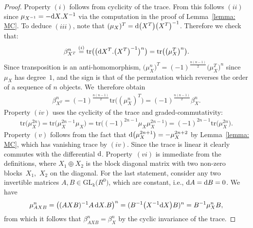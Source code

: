 \documentclass[pdftex]{sigma}%
\numberwithin{equation}{section}
\newcommand{\tr}{\mathrm{tr}}
\newcommand{\GL}{\mathrm{GL}}
\newcommand{\mc}{\mu}
\newcommand{\0}{\color{blue}{\mathsf{0}}}
\begin{document}
\begin{proof}
Property $(i)$ follows from cyclicity of the trace. From this follows $(ii)$ since $\mc_{X^{-1}} = - {\rm d}X. X^{-1}$ via the computation in the proof of Lemma~\ref{lemma: MC}. To deduce $(iii)$, note that $(\mc_X)^T = {\rm d} \big(X^T\big) \big(X^T\big)^{-1}$. Therefore we check that:
\begin{gather*}
\beta^n_{X^T} \overset{(i)}{=} \tr \big(\big({\rm d}X^T. \big(X^T\big)^{-1}\big)^n \big) =\tr \big(\big(\mc_X^T\big)^n\big) .
\end{gather*}
Since transposition is an anti-homomorphism, $\big(\mc_X^n\big)^T = (-1)^{\frac{n(n-1)}{2}} \big(\mc_X^T\big)^n$ since $\mu_X$ has degree~$1$, and the sign is that of the permutation which reverses the order of a sequence of $n$ objects. We~therefore obtain
\begin{gather*}
 \beta^n_{X^T} = (-1)^{\frac{n(n-1)}{2}} \tr \big((\mc^n_X)^T\big) =(-1)^{\frac{n(n-1)}{2}} \beta_X^n .
 \end{gather*}
Property $(iv)$ uses the cyclicity of the trace and graded-commutativity:
\begin{gather*}
\tr\big(\mc_X^{2n}\big) = \tr\big( \mc_X^{2n-1} \mc_X\big)= \tr\big( (-1)^{2n-1} \mc_X \mc_X^{2n-1}\big) = (-1)^{2n-1} \tr\big(\mc_X^{2n}\big) .
\end{gather*}
Property $(v)$ follows from the fact that ${\rm d} \big(\mc_X^{2n+1}\big) = -\mc_X^{2n+2}$ by Lemma~\ref{lemma: MC}, which has vanishing trace by $(iv)$. Since the trace is linear it clearly commutes with the differential ${\rm d}$. Property~$(vi)$ is immediate from the definitions, where $X_1\oplus X_2$ is the block diagonal matrix with two non-zero blocks~$X_1$,~$X_2$ on the diagonal.
For the last statement, consider any two invertible matrices $A,B \in \GL_k\big(R^0\big)$, which are constant, i.e., ${\rm d}A={\rm d}B=0$. We have
\begin{gather*}
\mc^n_{AXB} = \big((A X B)^{-1} A \,{\rm d}X. B\big)^n = (B^{-1} \big(X^{-1} {\rm d}X\big) B)^n = B^{-1} \mc_X^n B,
\end{gather*}
from which it follows that $\beta_{AXB}^n= \beta_{X}^n$ by the cyclic invariance of the trace.
\end{proof}
\end{document}
